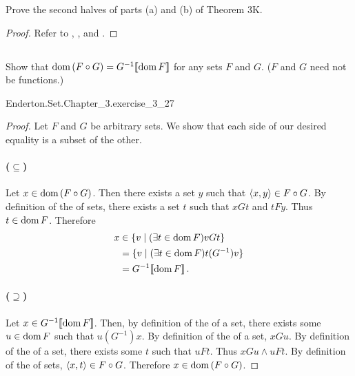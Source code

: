 \documentclass{report}
\begin{document}
  Prove the second halves of parts (a) and (b) of Theorem 3K.

  \begin{proof}
    Refer to , , and
      .
  \end{proof}

\subsection{}%

  Show that $\mathop{\text{dom}}{(F \circ G)} = G^{-1}\!\left\llbracket\mathop{\text{dom}}{F}\right\rrbracket$ for any sets $F$ and
    $G$.
  ($F$ and $G$ need not be functions.)

    {Enderton.Set.Chapter\_3.exercise\_3\_27}

  \begin{proof}
    Let $F$ and $G$ be arbitrary sets.
    We show that each side of our desired equality is a subset of the other.

    \paragraph{($\subseteq$)}%

      Let $x \in \mathop{\text{dom}}{(F \circ G)}$.
      Then there exists a set $y$ such that $\left< x, y \right> \in F \circ G$.
      By definition of the  of sets, there exists a set
        $t$ such that $xGt$ and $tFy$.
      Thus $t \in \mathop{\text{dom}}{F}$.
      Therefore
        \begin{align*}
          x
            & \in \{v \mid (\exists t \in \mathop{\text{dom}}{F}) vGt\} \\
            & = \{v \mid (\exists t \in \mathop{\text{dom}}{F}) t(G^{-1})v\} \\
            & = G^{-1}\!\left\llbracket\mathop{\text{dom}}{F}\right\rrbracket.
        \end{align*}

    \paragraph{($\supseteq$)}%

      Let $x \in G^{-1}\!\left\llbracket\mathop{\text{dom}}{F}\right\rrbracket$.
      Then, by definition of the  of a set, there exists some
        $u \in \mathop{\text{dom}}{F}$ such that $u(G^{-1})x$.
      By definition of the  of a set, $xGu$.
      By definition of the  of a set, there exists some $t$
        such that $uFt$.
      Thus $xGu \land uFt$.
      By definition of the  of sets,
        $\left< x, t \right> \in F \circ G$.
      Therefore $x \in \mathop{\text{dom}}{(F \circ G)}$.

  \end{proof}
\end{document}
